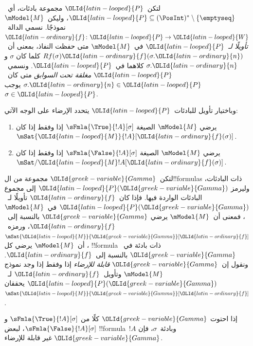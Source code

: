 \documentclass[../../../include/open-logic-section]{subfiles}
\begin{document}
\begin{defn}
  لتكن~$\OLId{latin-looped}{P}$ مجموعة بادئات، أي~$\OLId{latin-looped}{P} \subseteq (\PosInt)^*
  \setminus \{\emptyseq\}$، وليكن~$\mModel{M}$ نموذجًا.
  نسمي الدالة~$\OLId{latin-ordinary}{f}\colon \OLId{latin-looped}{P} \to \OLId{latin-looped}{W}$ \emph{تأويلًا لـ}~$\OLId{latin-looped}{P}$ في~$\mModel{M}$
  متى حفظت النفاذ، بمعنى أن~$Rf(\sigma)\OLId{latin-ordinary}{f}(\sigma.\OLId{latin-ordinary}{n})$ كلما كان
  $\sigma$ و$\sigma.\OLId{latin-ordinary}{n}$ كلاهما في~$\OLId{latin-looped}{P}$.
  ونسمي~$\OLId{latin-looped}{P}$ \emph{مغلقة تحت السوابق} متى كان~$\sigma.\OLId{latin-ordinary}{n} \in \OLId{latin-looped}{P}$
  يوجب~$\sigma \in \OLId{latin-looped}{P}$.

  وباختيار تأويل للبادئات~$\OLId{latin-looped}{P}$ يتحدد الإرضاء على الوجه الآتي:
  \begin{enumerate}
  \item يرضي $\mModel{M}$ الصيغة $\sFmla{\True}{!A}[\sigma]$ إذا وفقط إذا
    كان $\mSat{\OLId{latin-looped}{M}}{!A}[\OLId{latin-ordinary}{f}(\sigma)]$.
  \item يرضي $\mModel{M}$ الصيغة $\sFmla{\False}{!A}[\sigma]$ إذا وفقط إذا
    كان $\mSat/{\OLId{latin-looped}{M}}{!A}[\OLId{latin-ordinary}{f}(\sigma)]$.
  \end{enumerate}
\end{defn}

\begin{defn}
  لتكن~$\OLId{greek-variable}{Gamma}$ مجموعة من ال!!{formula}s ذات البادئات، وليرمز
  $\OLId{latin-looped}{P}(\OLId{greek-variable}{Gamma})$ إلى مجموع البادئات الواردة فيها. فإذا كان~$\OLId{latin-ordinary}{f}$ تأويلًا
  لـ~$\OLId{latin-looped}{P}(\OLId{greek-variable}{Gamma})$ في~$\mModel{M}$، فمعنى أن~$\mModel{M}$ يرضي
  $\OLId{greek-variable}{Gamma}$ بالنسبة إلى~$\OLId{latin-ordinary}{f}$، ورمزه~$\mSat{\OLId{latin-looped}{M}}{\OLId{greek-variable}{Gamma}}[\OLId{latin-ordinary}{f}]$، أن~$\mModel{M}$
  يرضي كل !!{formula} ذات بادئة في~$\OLId{greek-variable}{Gamma}$ بالنسبة إلى~$\OLId{latin-ordinary}{f}$.
  ونقول إن~$\OLId{greek-variable}{Gamma}$ \emph{قابلة للإرضاء} إذا وفقط إذا وجد نموذج
  $\mModel{M}$ وتأويل~$\OLId{latin-ordinary}{f}$ لـ~$\OLId{latin-looped}{P}(\OLId{greek-variable}{Gamma})$ يحققان~$\mSat{\OLId{latin-looped}{M}}{\OLId{greek-variable}{Gamma}}[\OLId{latin-ordinary}{f}]$.
\end{defn}

\begin{prop}
  إذا احتوت $\OLId{greek-variable}{Gamma}$ كلًا من $\sFmla{\True}{!A}[\sigma]$ و
  $\sFmla{\False}{!A}[\sigma]$، لبعض !!{formula}~$!A$ وبادئة~$\sigma$،
  فإن $\OLId{greek-variable}{Gamma}$ غير قابلة للإرضاء.
\end{prop}
\end{document}
